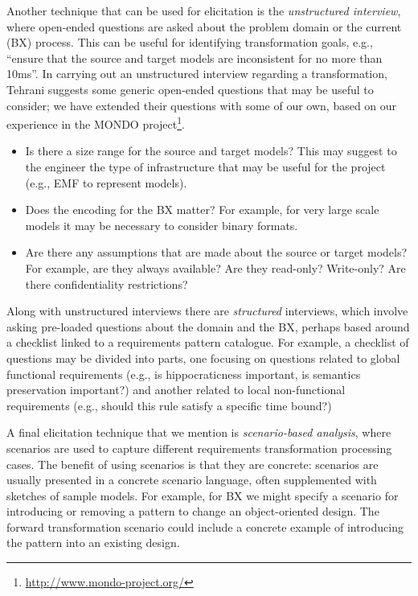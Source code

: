 Another technique that can be used for elicitation is the \textit{unstructured interview}, where open-ended questions are asked about the problem domain or the current (BX) process. This can be useful for identifying transformation goals, e.g., ``ensure that the source and target models are inconsistent for no more than 10ms''. In carrying out an unstructured interview regarding a transformation, Tehrani \cite{TehraniZL16} suggests some generic open-ended questions that may be useful to consider; we have extended their questions with some of our own, based on our experience in the MONDO project\footnote{\url{http://www.mondo-project.org/}}.
\begin{itemize}
\item Is there a size range for the source and target models? This may suggest to the engineer the type of infrastructure that may be useful for the project (e.g., EMF to represent models).

\item Does the encoding for the BX matter? For example, for very large scale models it may be necessary to consider binary formats.

\item Are there any assumptions that are made about the source or target models? For example, are they always available? Are they read-only? Write-only? Are there confidentiality restrictions?
\end{itemize}
Along with unstructured interviews there are \textit{structured} interviews, which involve asking pre-loaded questions about the domain and the BX, perhaps based around a checklist linked to a requirements pattern catalogue. For example, a checklist of questions may be divided into parts, one focusing on questions related to global functional requirements (e.g., is hippocraticness important, is semantics preservation important?) and another related to local non-functional requirements (e.g., should this rule satisfy a specific time bound?)

A final elicitation technique that we mention is \textit{scenario-based analysis}, where scenarios are used to capture different requirements transformation processing cases. The benefit of using scenarios is that they are concrete: scenarios are usually presented in a concrete scenario language, often supplemented with sketches of sample models. For example, for BX we might specify a scenario for introducing or removing a pattern to change an object-oriented design. The forward transformation scenario could include a concrete example of introducing the pattern into an existing design.

